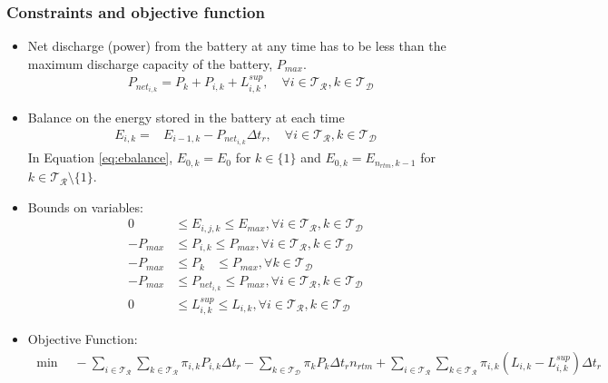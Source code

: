 \documentclass[11pt,twoside]{article}
\begin{document}
\subsubsection{Constraints and objective function}\label{subsec:const_obj}
\begin{itemize}
\item Net discharge (power) from the battery at any time has to be less than the maximum discharge capacity of the battery, $P_{max}$.
\begin{align}\label{eq:Pnet}
&P_{{net}_{i,k}} = P_{k} + P_{i,k} + L^{sup}_{i,k}, \quad \forall i \in \mathcal{T_R}, k \in \mathcal{T_D}
\end{align}
\item Balance on the energy stored in the battery at each time
\begin{align}\label{eq:ebalance}
E_{i,k} =& E_{i-1,k}- P_{{net}_{i,k}}\Delta t_r, \quad \forall i \in \mathcal{T_R}, k \in \mathcal{T_D}
\end{align}
In Equation \eqref{eq:ebalance}, $E_{0,k} = E_{0}$ for $k \in \lbrace1\rbrace$ and $E_{0,k} = E_{n_{rtm},k-1}$ for $k \in \mathcal{T_R}\setminus{\lbrace1\rbrace}$. 
\item Bounds on variables:
\begin{subequations}\label{eq:bounds}
\begin{align}
0 & \leq E_{i,j,k} \leq E_{max}, \forall i \in \mathcal{T_R}, k \in \mathcal{T_D}\\
-P_{max} & \leq P_{i,k} \leq P_{max}, \forall i \in \mathcal{T_R}, k \in \mathcal{T_D}\\
-P_{max} & \leq P_{k}\phantom{i,} \leq P_{max}, \forall k \in \mathcal{T_D}\\
-P_{max} & \leq P_{{net}_{i,k}} \leq P_{max}, \forall i \in \mathcal{T_R}, k \in \mathcal{T_D}\\
0 & \leq L^{sup}_{i,k} \leq L_{i,k}, \forall i \in \mathcal{T_R}, k \in \mathcal{T_D}
\end{align}
\end{subequations}
\item Objective Function:
\begin{align}\label{objective}
\min \quad -\sum\limits_{i \in \mathcal{T_R}}\sum\limits_{k \in \mathcal{T_R}} \pi_{i,k}P_{i,k}\Delta t_r - \sum\limits_{k \in \mathcal{T_D}}\pi_{k}P_{k}\Delta t_r n_{rtm} + \sum\limits_{i \in \mathcal{T_R}}\sum\limits_{k \in \mathcal{T_R}} \pi_{i,k}(L_{i,k}-L^{sup}_{i,k})\Delta t_r
\end{align}
\end{itemize}
\end{document}
